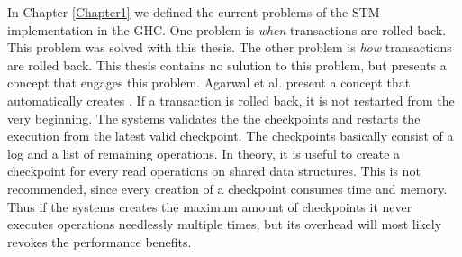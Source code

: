 In Chapter \ref{Chapter1} we defined the current problems of the STM implementation in the GHC. One problem
is \textit{when} transactions are rolled back. This problem was solved with this thesis. The other problem is
\textit{how} transactions are rolled back. This thesis contains no sulution to this problem, but \parencite{checkpoint}
presents a concept that engages this problem. Agarwal et al. present a concept that automatically creates 
. If a transaction is rolled back, it is not restarted from the very beginning. The 
systems validates the the checkpoints and restarts the execution from the latest valid checkpoint.
The checkpoints basically consist of a log and a list of remaining operations. In theory, it is useful
to create a checkpoint for every read operations on shared data structures. This is not recommended, since
every creation of a checkpoint consumes time and memory. Thus if the systems creates the maximum amount 
of checkpoints it never executes operations needlessly multiple times, but its overhead will
most likely revokes the performance benefits.   
